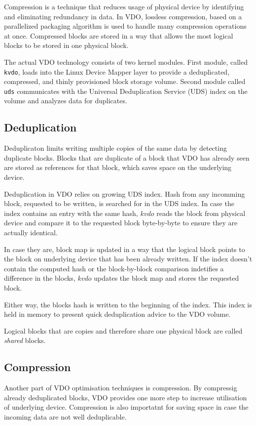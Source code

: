 \documentclass[
  color, %
  table, %
  lof,   %
  lot,   %
]{fithesis3}
\begin{document}
Compression is a technique that reduces usage of physical device by identifying and eliminating redundancy in data. In VDO, lossless compression, based on a parallelized packaging algorithm is used to handle many compression operations at once. Compressed blocks are stored in a way that allows the most logical blocks to be stored in one physical block.

The actual VDO technology consists of two kernel modules. First module, called \texttt{kvdo}, loads into the Linux Device Mapper layer to provide a deduplicated, compressed, and thinly provisioned block storage volume. Second module called \texttt{uds} communicates with the Universal Deduplication Service (UDS) index on the volume and analyzes data for duplicates.

\subsection{Deduplication}
Deduplicaton limits writing multiple copies of the same data by detecting duplicate blocks. Blocks that are duplicate of a block that VDO has already seen are stored as references for that block, which saves space on the underlying device.

Deduplication in VDO relies on growing UDS index. Hash from any incomming block, requested to be written, is searched for in the UDS index. In case the index contains an entry with the same hash, $kvdo$ reads the block from physical device and compare it to the requested block byte-by-byte to ensure they are actually identical.

In case they are, block map is updated in a way that the logical block points to the block on underlying device that has been already written. If the index doesn't contain the computed hash or the block-by-block comparison indetifies a difference in the blocks, $kvdo$ updates the block map and stores the requested block.

Either way, the blocks hash is written to the beginning of the index. This index is held in memory to present quick deduplication advice to the VDO volume.

Logical blocks that are copies and therefore share one physical block are called \emph{shared} blocks.

\subsection{Compression}
Another part of VDO optimisation techniques is compression. By compressig already deduplicated blocks, VDO provides one more step to increase utilisation of underlying device. Compression is also importatnt for saving space in case the incoming data are not well deduplicable.
\end{document}
